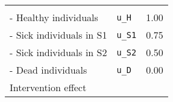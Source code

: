 \documentclass[]{article}
\begin{document}
\begin{longtable}[]{@{}llc@{}}
\begin{minipage}[t]{0.20\columnwidth}
\strut
\end{minipage}\tabularnewline
\begin{minipage}[t]{0.47\columnwidth}\raggedright\strut
- Healthy individuals\strut
\end{minipage} & \begin{minipage}[t]{0.18\columnwidth}\raggedright\strut
\texttt{u\_H}\strut
\end{minipage} & \begin{minipage}[t]{0.20\columnwidth}\centering\strut
1.00\strut
\end{minipage}\tabularnewline
\begin{minipage}[t]{0.47\columnwidth}\raggedright\strut
- Sick individuals in S1\strut
\end{minipage} & \begin{minipage}[t]{0.18\columnwidth}\raggedright\strut
\texttt{u\_S1}\strut
\end{minipage} & \begin{minipage}[t]{0.20\columnwidth}\centering\strut
0.75\strut
\end{minipage}\tabularnewline
\begin{minipage}[t]{0.47\columnwidth}\raggedright\strut
- Sick individuals in S2\strut
\end{minipage} & \begin{minipage}[t]{0.18\columnwidth}\raggedright\strut
\texttt{u\_S2}\strut
\end{minipage} & \begin{minipage}[t]{0.20\columnwidth}\centering\strut
0.50\strut
\end{minipage}\tabularnewline
\begin{minipage}[t]{0.47\columnwidth}\raggedright\strut
- Dead individuals\strut
\end{minipage} & \begin{minipage}[t]{0.18\columnwidth}\raggedright\strut
\texttt{u\_D}\strut
\end{minipage} & \begin{minipage}[t]{0.20\columnwidth}\centering\strut
0.00\strut
\end{minipage}\tabularnewline
\begin{minipage}[t]{0.47\columnwidth}\raggedright\strut
Intervention effect\strut
\end{minipage} & \begin{minipage}[t]{0.18\columnwidth}\raggedright\strut
\strut
\end{minipage} & \begin{minipage}[t]{0.20\columnwidth}\centering\strut

\end{minipage}
\end{longtable}
\end{document}
